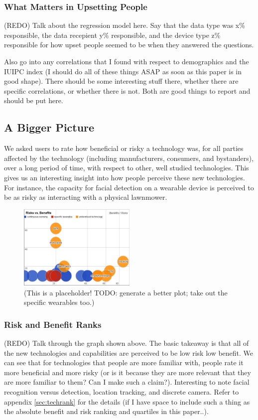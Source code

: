 \documentclass{acm_proc_article-sp}
\begin{document}
\subsubsection{What Matters in Upsetting People}
(REDO) Talk about the regression model here. Say that the data type was x\% responsible, the data recepient y\% responsible, and the device type z\% responsible for how upset people seemed to be when they answered the questions. 

Also go into any correlations that I found with respect to demographics and the IUIPC index (I should do all of these things ASAP as soon as this paper is in good shape). There should be some interesting stuff there, whether there are specific correlations, or whether there is not. Both are good things to report and should be put here. 

\subsection{A Bigger Picture}

We asked users to rate how beneficial or risky a technology was, for all parties affected by the technology (including manufacturers, consumers, and bystanders), over a long period of time, with respect to other, well studied technologies. This gives us an interesting insight into how people perceive these new technologies. For instance, the capacity for facial detection on a wearable device is perceived to be as risky as interacting with a physical lawnmower. 

\begin{figure}
	\centering
	\includegraphics[width=0.5\textwidth]{techplot.png}
	\caption{(This is a placeholder! TODO: generate a better plot; take out the specific wearables too.)}
\end{figure}

\subsubsection{Risk and Benefit Ranks} 
(REDO) Talk through the graph shown above. The basic takeaway is that all of the new technologies and capabilities are perceived to be low risk low benefit. We can see that for technologies that people are more familiar with, people rate it more beneficial and more risky (or is it because they are more relevant that they are more familiar to them? Can I make such a claim?). Interesting to note facial recognition versus detection, location tracking, and discrete camera. Refer to appendix \ref{sec:techrank} for the details (if I have space to include such a thing as the absolute benefit and risk ranking and quartiles in this paper..). 
\end{document}
